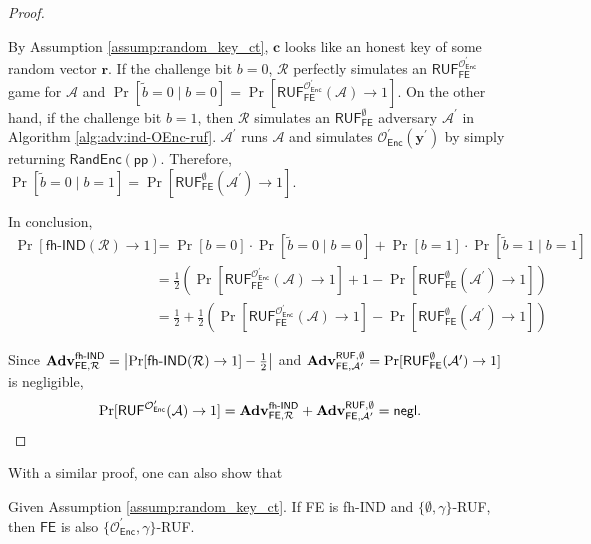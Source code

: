 \begin{proof}
\begin{figure}[h]
\end{figure}

By Assumption \ref{assump:random_key_ct}, $\mathbf{c}$ looks like an honest key of some random vector $\mathbf{r}$. If the challenge bit $b = 0$, $\mathcal{R}$ perfectly simulates an $\textsf{RUF}^{\mathcal{O}^\prime_{\textsf{Enc}}}_{\textsf{FE}}$ game for $\mathcal{A}$ and $\Pr[\tilde{b} = 0 \mid b = 0] = \Pr[ \textsf{RUF}^{\mathcal{O}^\prime_{\textsf{Enc}}}_{\textsf{FE}}(\mathcal{A}) \to 1 ]$. On the other hand, if the challenge bit $b = 1$, then $\mathcal{R}$ simulates an $\textsf{RUF}^{\emptyset}_{\textsf{FE}}$ adversary $\mathcal{A}^\prime$ in Algorithm \ref{alg:adv:ind-OEnc-ruf}. $\mathcal{A}^\prime$ runs $\mathcal{A}$ and simulates $\mathcal{O}^\prime_{\textsf{Enc}}(\mathbf{y}^\prime)$ by simply returning $\textsf{RandEnc}(\textsf{pp})$. Therefore, $\Pr[\tilde{b} = 0 \mid b = 1] = \Pr[ \textsf{RUF}^{\emptyset}_{\textsf{FE}}(\mathcal{A}^\prime) \to 1 ]$.

In conclusion,
\begin{align*}
	\Pr[\textsf{fh-IND}(\mathcal{R}) \to 1] 
	&= \Pr[b = 0] \cdot \Pr[\tilde{b} = 0 \mid b = 0] + \Pr[b = 1] \cdot \Pr[\tilde{b} = 1 \mid b = 1] \\
	&= \frac{1}{2} \left( \Pr[\textsf{RUF}^{\mathcal{O}^\prime_{\textsf{Enc}}}_{\textsf{FE}}(\mathcal{A}) \to 1] + 1 - \Pr[ \textsf{RUF}^{\emptyset}_{\textsf{FE}}(\mathcal{A}^\prime) \to 1 ] \right) \\
	&= \frac{1}{2} + \frac{1}{2} \left( \Pr[\textsf{RUF}^{\mathcal{O}^\prime_{\textsf{Enc}}}_{\textsf{FE}}(\mathcal{A}) \to 1] - \Pr[ \textsf{RUF}^{\emptyset}_{\textsf{FE}}(\mathcal{A}^\prime) \to 1 ] \right)
\end{align*}

Since $\mathbf{Adv}_{\textsf{FE}, \mathcal{R}}^\textsf{fh-IND} = \left| \Pr[\textsf{fh-IND}(\mathcal{R}) \to 1] - \frac{1}{2} \right|$ and $\mathbf{Adv}_{\textsf{FE}, \mathcal{A}^\prime }^{\textsf{RUF}, \emptyset} = \Pr[\textsf{RUF}^{\emptyset}_{\textsf{FE}}(\mathcal{A}^\prime) \to 1 ]$ is negligible,
\[
	\Pr[ \textsf{RUF}^{\mathcal{O}^\prime_{\textsf{Enc}}}(\mathcal{A}) \to 1]  = \mathbf{Adv}_{\textsf{FE}, \mathcal{R}}^\textsf{fh-IND} + \mathbf{Adv}_{\textsf{FE}, \mathcal{A}^\prime }^{\textsf{RUF}, \emptyset} = \mathsf{negl}.
\]

\end{proof}

With a similar proof, one can also show that

\begin{theorem}
\label{thm:fh-IPFE:ind-OEnc-gamma-ruf}
Given Assumption \ref{assump:random_key_ct}. If \textsf{FE} is fh-IND and $\{ \emptyset, \gamma \}$-RUF, then $\textsf{FE}$ is also $\{ \mathcal{O}^\prime_{\textsf{Enc}}, \gamma \}$-RUF.

\end{theorem}

